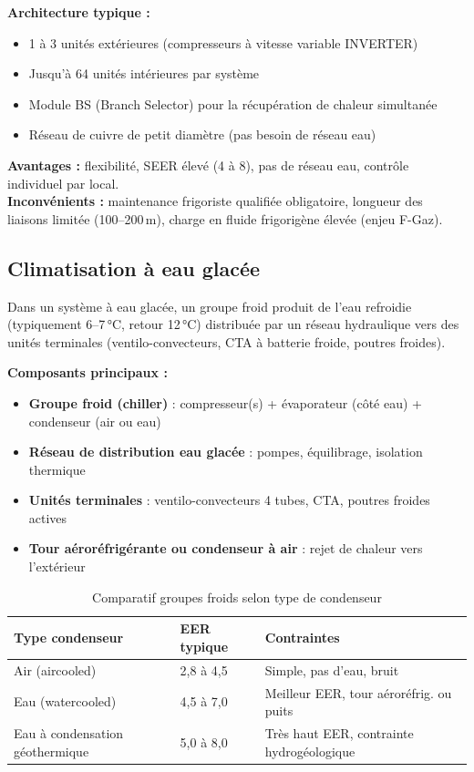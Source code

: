 \textbf{Architecture typique :}
\begin{itemize}
  \item 1 à 3 unités extérieures (compresseurs à vitesse variable INVERTER)
  \item Jusqu'à 64 unités intérieures par système
  \item Module BS (Branch Selector) pour la récupération de chaleur simultanée
  \item Réseau de cuivre de petit diamètre (pas besoin de réseau eau)
\end{itemize}

\textbf{Avantages :} flexibilité, SEER élevé (4 à 8), pas de réseau eau, contrôle individuel par local.\\
\textbf{Inconvénients :} maintenance frigoriste qualifiée obligatoire, longueur des liaisons limitée (100–200\,m), charge en fluide frigorigène élevée (enjeu F-Gaz).

\subsection{Climatisation à eau glacée}

\begin{definition}[title=Système à eau glacée (Chilled Water)]
Dans un système à eau glacée, un groupe froid produit de l'eau refroidie (typiquement 6–7\,°C, retour 12\,°C) distribuée par un réseau hydraulique vers des unités terminales (ventilo-convecteurs, CTA à batterie froide, poutres froides).
\end{definition}

\textbf{Composants principaux :}
\begin{itemize}
  \item \textbf{Groupe froid (chiller)} : compresseur(s) + évaporateur (côté eau) + condenseur (air ou eau)
  \item \textbf{Réseau de distribution eau glacée} : pompes, équilibrage, isolation thermique
  \item \textbf{Unités terminales} : ventilo-convecteurs 4 tubes, CTA, poutres froides actives
  \item \textbf{Tour aéroréfrigérante ou condenseur à air} : rejet de chaleur vers l'extérieur
\end{itemize}

\begin{table}[H]
  \centering
  \caption{Comparatif groupes froids selon type de condenseur}
  \begin{tabular}{p{3.5cm}p{4cm}p{4cm}}
    \toprule
    Type condenseur & EER typique & Contraintes \\
    \midrule
    Air (aircooled) & 2,8 à 4,5 & Simple, pas d'eau, bruit \\
    Eau (watercooled) & 4,5 à 7,0 & Meilleur EER, tour aéroréfrig. ou puits \\
    Eau à condensation géothermique & 5,0 à 8,0 & Très haut EER, contrainte hydrogéologique \\
    \bottomrule
  \end{tabular}
\end{table}

